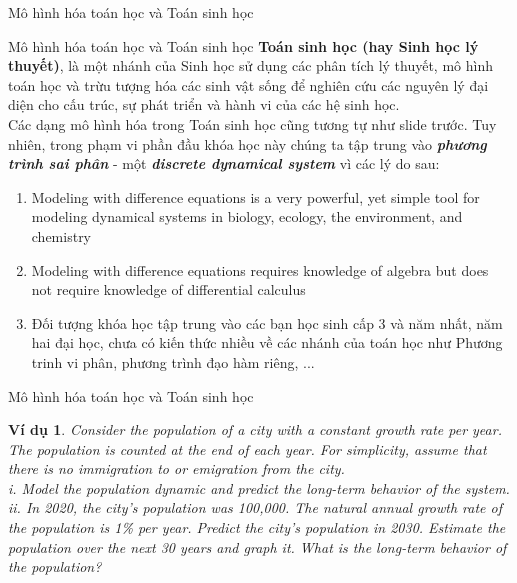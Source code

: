 \documentclass[pdf,aspectratio=169]{beamer}
\newtheorem*{vidu}{Ví dụ}
\begin{document}
\begin{frame}[plain]
    \begin{center}
        \vspace{1cm}
        \Huge Mô hình hóa toán học và Toán sinh học
    \end{center}
\end{frame}

\begin{frame}{Mô hình hóa toán học và Toán sinh học}
    \textbf{Toán sinh học (hay Sinh học lý thuyết)}, là một nhánh của Sinh học
    sử dụng các phân tích lý thuyết, mô hình toán học và trừu tượng hóa các sinh vật sống
    để nghiên cứu các nguyên lý đại diện cho cấu trúc, sự phát triển và hành vi của các hệ sinh học. \\
    Các dạng mô hình hóa trong Toán sinh học cũng tương tự như slide trước. Tuy nhiên, trong phạm vi
    phần đầu khóa học này chúng ta tập trung vào \textbf{\textit{phương trình sai phân}} - một \textbf{\textit{discrete dynamical system}} vì các lý do sau:
    \begin{enumerate}
        \item Modeling with difference equations is a very powerful, yet
              simple tool for modeling dynamical systems in biology, ecology,
              the environment, and chemistry
        \item Modeling with difference equations requires knowledge of
              algebra but does not require knowledge of differential calculus
        \item Đối tượng khóa học tập trung vào các bạn học sinh cấp 3 và năm nhất, năm hai đại học,
              chưa có kiến thức nhiều về các nhánh của toán học như Phương trinh vi phân, phương trình đạo hàm riêng, ...
    \end{enumerate}
\end{frame}

\begin{frame}{Mô hình hóa toán học và Toán sinh học}
    \begin{vidu}
        Consider the population of a city with a constant growth rate per year. The
        population is counted at the end of each year. For simplicity, assume that
        there is no immigration to or emigration from the city.\\
        i. Model the population dynamic and predict the long-term behavior
        of the system.\\
        ii. In 2020, the city’s population was 100,000. The natural annual
        growth rate of the population is 1\% per year. Predict the city’s
        population in 2030. Estimate the population over the next 30 years
        and graph it. What is the long-term behavior of the population?
    \end{vidu}
\end{frame}
\end{document}

